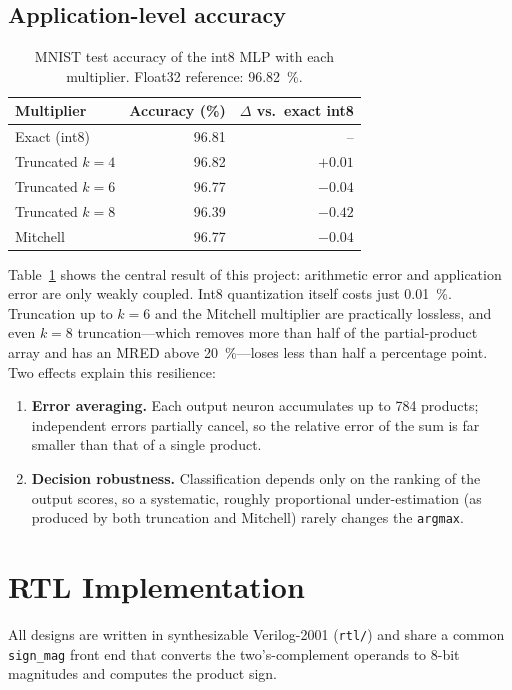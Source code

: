 \documentclass[11pt,a4paper]{article}
\begin{document}
\subsection{Application-level accuracy}
\begin{table}[H]
\centering
\caption{MNIST test accuracy of the int8 MLP with each multiplier.
Float32 reference: \SI{96.82}{\percent}.}
\label{tab:acc}
\begin{tabular}{lrr}
\toprule
Multiplier & Accuracy (\%) & $\Delta$ vs.\ exact int8 \\
\midrule
Exact (int8)      & 96.81 & --    \\
Truncated $k{=}4$ & 96.82 & $+0.01$ \\
Truncated $k{=}6$ & 96.77 & $-0.04$ \\
Truncated $k{=}8$ & 96.39 & $-0.42$ \\
Mitchell          & 96.77 & $-0.04$ \\
\bottomrule
\end{tabular}
\end{table}

Table~\ref{tab:acc} shows the central result of this project: arithmetic error
and application error are only weakly coupled. Int8 quantization itself costs
just \SI{0.01}{\percent}. Truncation up to $k=6$ and the Mitchell multiplier are
practically lossless, and even $k=8$ truncation---which removes more than half
of the partial-product array and has an MRED above \SI{20}{\percent}---loses
less than half a percentage point. Two effects explain this resilience:
\begin{enumerate}[nosep]
  \item \textbf{Error averaging.} Each output neuron accumulates up to 784
        products; independent errors partially cancel, so the relative error
        of the sum is far smaller than that of a single product.
  \item \textbf{Decision robustness.} Classification depends only on the
        ranking of the output scores, so a systematic, roughly proportional
        under-estimation (as produced by both truncation and Mitchell) rarely
        changes the \texttt{argmax}.
\end{enumerate}

\section{RTL Implementation}
All designs are written in synthesizable Verilog-2001 (\texttt{rtl/}) and
share a common \texttt{sign\_mag} front end that converts the
two's-complement operands to 8-bit magnitudes and computes the product sign.
\end{document}
